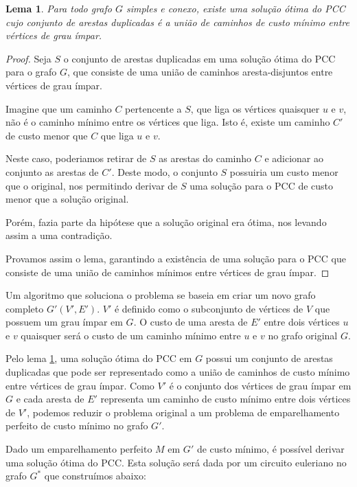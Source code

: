 \documentclass[12pt, a4paper]{article}
\newtheorem{lemma}{Lema}
\begin{document}
\begin{lemma}
    \label{lema-final}
    Para todo grafo $G$ simples e conexo, existe uma solução ótima do PCC cujo conjunto de arestas duplicadas é a união de caminhos de custo mínimo entre vértices de grau ímpar.
\end{lemma}

\begin{proof}
    Seja $S$ o conjunto de arestas duplicadas em uma solução ótima do PCC para o grafo $G$, que consiste de uma união de caminhos aresta-disjuntos entre vértices de grau ímpar.

    Imagine que um caminho $C$ pertencente a $S$, que liga os vértices quaisquer $u$ e $v$, não é o caminho mínimo entre os vértices que liga. 
    Isto é, existe um caminho $C'$ de custo menor que $C$ que liga $u$ e $v$.

    Neste caso, poderiamos retirar de $S$ as arestas do caminho $C$ e adicionar ao conjunto as arestas de $C'$. Deste modo, o conjunto $S$ possuiria um custo menor que o original, nos permitindo derivar de $S$ uma solução para o PCC de custo menor que a solução original.

    Porém, fazia parte da hipótese que a solução original era ótima, nos levando assim a uma contradição.

    Provamos assim o lema, garantindo a existência de uma solução para o PCC que consiste de uma união de caminhos mínimos entre vértices de grau ímpar.

\end{proof}

Um algoritmo que soluciona o problema se baseia em criar um novo grafo completo $G'(V', E')$. 
$V'$ é definido como o subconjunto de vértices de $V$ que possuem um grau ímpar em $G$. 
O custo de uma aresta de $E'$ entre dois vértices $u$ e $v$ quaisquer será o custo de um caminho mínimo entre $u$ e $v$ no grafo original $G$.


Pelo lema \ref{lema-final}, uma solução ótima do PCC em $G$ possui um conjunto de arestas duplicadas que pode ser representado como a união de caminhos de custo mínimo entre vértices de grau ímpar. 
Como $V'$ é o conjunto dos vértices de grau ímpar em $G$ e cada aresta de $E'$ representa um caminho de custo mínimo entre dois vértices de $V'$, podemos reduzir o problema original a um problema de emparelhamento perfeito de custo mínimo no grafo $G'$.

Dado um emparelhamento perfeito $M$ em $G'$ de custo mínimo, é possível derivar uma solução ótima do PCC. Esta solução será dada por um circuito euleriano no grafo $G^*$ que construímos abaixo:
\end{document}
